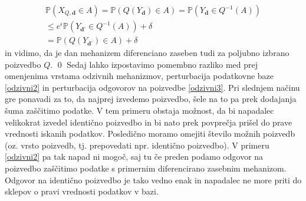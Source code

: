 \documentclass[12pt,a4paper]{amsart}
\theoremstyle{definition} %
\theoremstyle{plain} %
\begin{document}
\begin{equation*}
\begin{split}
\mathbb{P}(X_{Q, \textbf{d}} \in A) = \mathbb{P}(Q(Y_{ \textbf{d}}) \in A)  = \mathbb{P}(Y_{\textbf{d}} \in Q^{-1}(A)) \\
\leq e^\epsilon \mathbb{P}(Y_{\textbf{d'}} \in Q^{-1}(A)) + \delta \\ 
= \mathbb{P}(Q(Y_\textbf{d'}) \in A) + \delta
\end{split}
\end{equation*}
in vidimo, da je dan mehanizem diferenciano zaseben tudi za poljubno izbrano poizvedbo $Q$.
\qed
\newline
\newline
Sedaj lahko izpostavimo pomembno razliko med prej omenjenima vrstama odzivnih mehanizmov, perturbacija podatkovne baze \eqref{odzivni2} in perturbacija odgovorov na poizvedbe \eqref{odzivni3}. Pri slednjem načinu gre ponavadi za to, da najprej izvedemo poizvedbo, šele na to pa prek dodajanja šuma zaščitimo podatke. V tem primeru obstaja možnost, da bi napadalec velikokrat izvedel identično poizvedbo in bi nato prek povprečja prišel do prave vrednosti iskanih podatkov. Posledično moramo omejiti število možnih poizvedb (oz. vrsto poizvedb, tj. prepovedati npr. identično poizvedbo). V primeru \eqref{odzivni2} pa tak napad ni mogoč, saj tu če preden podamo odgovor na poizvedbo zaščitimo podatke s primernim diferencirano zasebnim mehanizom. Odgovor na identično poizvedbo je tako vedno enak in napadalec ne more priti do sklepov o pravi vrednosti podatkov v bazi. 
\end{document}
